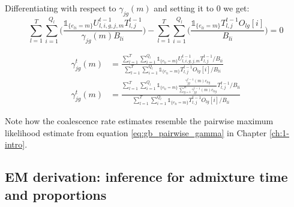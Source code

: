 Differentiating with respect to $\gamma_{jg}(m)$ and setting it to 0 we get:
\begin{equation}
\sum_{l = 1}^T \sum_{i = 1}^{Q_l}  \Big( \frac{\mathds{1}_{\{e_{l i} = m\}}U_{l,i,g,j,m}^{t-1} T_{l,j}^{t-1}}{\gamma_{jg}(m)B_{li}} \Big) -  \sum_{l = 1}^T \sum_{i = 1}^{Q_l} \Big(\frac{\mathds{1}_{\{e_{l i} = m\}} T_{l,j}^{t-1}  O_{lg}[i]}{B_{li}} \Big) = 0
\end{equation} 

\begin{align}
    \gamma_{jg}^{t}(m) &= \frac{\sum_{l = 1}^T \sum_{i = 1}^{Q_l}  \mathds{1}_{\{e_{l i} = m\}} U_{l,i,g,j,m}^{t-1} T_{l,j}^{t-1}/B_{li}}{\sum_{l = 1}^T \sum_{i = 1}^{Q_l}  \mathds{1}_{\{e_{l i} = m\}} T_{l,j}^{t-1}  O_{lg}[i]/B_{li} } \nonumber \\
    \gamma_{jg}^{t}(m) &= \frac{\sum_{l = 1}^T \sum_{i = 1}^{Q_l}  \mathds{1}_{\{e_{l i} = m\}} \frac{\gamma_{jg}^{t-1}(m)c_{lig}}{\sum_{g=1}^R \gamma_{jg}^{t-1}(m)c_{lig}} T_{l,j}^{t-1}/B_{li}}{\sum_{l = 1}^T \sum_{i = 1}^{Q_l}  \mathds{1}_{\{e_{l i} = m\}} T_{l,j}^{t-1}  O_{lg}[i]/B_{li} }
\label{eq:gamma_update}
\end{align}

Note how the coalescence rate estimates resemble the pairwise maximum likelihood estimate from equation \ref{eq:gb_pairwise_gamma} in Chapter \ref{ch:1-intro}.


\subsection{EM derivation: inference for admixture time and proportions}

